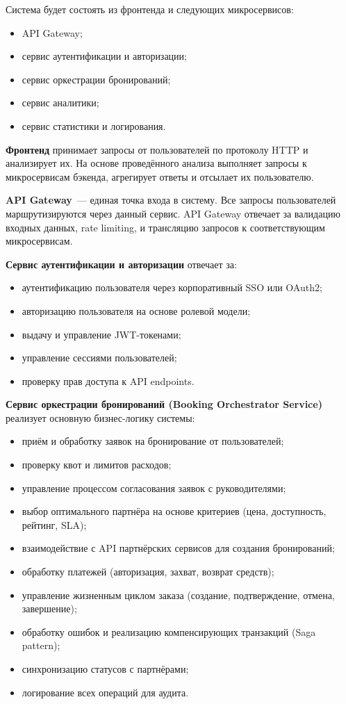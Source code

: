 \documentclass{bmstu}
\begin{document}
Система будет состоять из фронтенда и следующих микросервисов:

\begin{itemize}
    \item API Gateway;
    \item сервис аутентификации и авторизации;
    \item сервис оркестрации бронирований;
    \item сервис аналитики;
    \item сервис статистики и логирования.
\end{itemize}

\textbf{Фронтенд} принимает запросы от пользователей по протоколу HTTP и анализирует их. На основе проведённого анализа выполняет запросы к микросервисам бэкенда, агрегирует ответы и отсылает их пользователю.

\textbf{API Gateway}~--- единая точка входа в систему. Все запросы пользователей маршрутизируются через данный сервис. API Gateway отвечает за валидацию входных данных, rate limiting, и трансляцию запросов к соответствующим микросервисам.

\textbf{Сервис аутентификации и авторизации} отвечает за:
\begin{itemize}
    \item аутентификацию пользователя через корпоративный SSO или OAuth2;
    \item авторизацию пользователя на основе ролевой модели;
    \item выдачу и управление JWT-токенами;
    \item управление сессиями пользователей;
    \item проверку прав доступа к API endpoints.
\end{itemize}

\textbf{Сервис оркестрации бронирований (Booking Orchestrator Service)} реализует основную бизнес-логику системы:
\begin{itemize}
    \item приём и обработку заявок на бронирование от пользователей;
    \item проверку квот и лимитов расходов;
    \item управление процессом согласования заявок с руководителями;
    \item выбор оптимального партнёра на основе критериев (цена, доступность, рейтинг, SLA);
    \item взаимодействие с API партнёрских сервисов для создания бронирований;
    \item обработку платежей (авторизация, захват, возврат средств);
    \item управление жизненным циклом заказа (создание, подтверждение, отмена, завершение);
    \item обработку ошибок и реализацию компенсирующих транзакций (Saga pattern);
    \item синхронизацию статусов с партнёрами;
    \item логирование всех операций для аудита.
\end{itemize}
\end{document}
